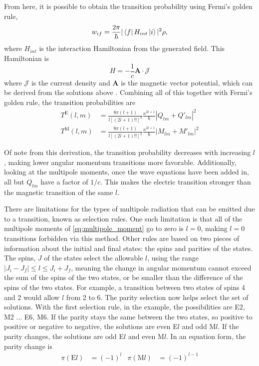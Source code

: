 From here, it is possible to obtain the transition probability using Fermi's golden rule,
\begin{equation}
    \label{eq:golden}
    w_{if}=\frac{2\pi}{\hbar}|\bra{f}H_{int}\ket{i}|^2\rho,
\end{equation}
where $H_{int}$ is the interaction Hamiltonian from the generated field. This Hamiltonian is
\begin{equation}
    H = -\frac{1}{c}\boldsymbol{A}\cdot\mathcal{J}
\end{equation}
where $\mathcal{J}$ is the current density and $\boldsymbol{A}$ is the magnetic vector potential, which can be derived from the solutions above \citep{wong90:_nuclear}. Combining all of this together with Fermi's golden rule, the transition probabilities are
\begin{subequations}
\begin{align}
    T^\text{E}(l,m) & = \frac{8\pi(l+1)}{l[(2l+1)!!]^2}\frac{\kappa^{2l+1}}{\hbar}|Q_{lm}+Q'_{lm}|^2 \\
    T^\text{M}(l,m) & = \frac{8\pi(l+1)}{l[(2l+1)!!]^2}\frac{\kappa^{2l+1}}{\hbar}|M_{lm}+M'_{lm}|^2
\end{align}
\end{subequations}

Of note from this derivation, the transition probability decreases with increasing $l$, making lower angular momentum transitions more favorable. Additionally, looking at the multipole moments, once the wave equations have been added in, all but $Q_{lm}$ have a factor of $1/c$. This makes the electric transition stronger than the magnetic transition of the same $l$.

There are limitations for the types of multipole radiation that can be emitted due to a transition, known as selection rules. One such limitation is that all of the multipole moments of \ref{eq:multipole_moment} go to zero is $l=0$, making $l=0$ transitions forbidden via this method. Other rules are based on two pieces of information about the initial and final states: the spins and parities of the states. The spins, $J$ of the states select the allowable $l$, using the range $|J_i-J_f|\leq l\leq J_i+J_f$, meaning the change in angular momentum cannot exceed the sum of the spins of the two states, or be smaller than the difference of the spins of the two states. For example, a transition between two states of spins 4 and 2 would allow $l$ from 2 to 6. The parity selection now helps select the set of solutions. With the first selection rule, in the example, the possibilities are E2, M2 ... E6, M6. If the parity stays the same between the two states, so positive to positive or negative to negative, the solutions are even E$l$ and odd M$l$. If the parity changes, the solutions are odd E$l$ and even M$l$. In an equation form, the parity change is
\begin{align}
    \pi(\text{E}l) &= (-1)^{l} & \pi(\text{M}l) &= (-1)^{l-1}
\end{align}

